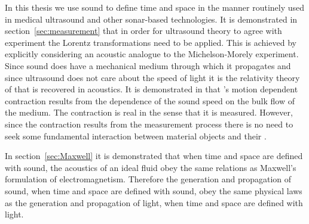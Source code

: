 





In this thesis we use sound to define time and space 
in the manner  routinely used in medical ultrasound and other sonar-based technologies.
It is demonstrated in section~\ref{sec:measurement} that in order for ultrasound theory 
to agree with experiment the Lorentz transformations need to be applied.
This is achieved by explicitly considering an acoustic analogue to the Michelson-Morely experiment.
Since sound  does have a mechanical medium through which it propagates and since ultrasound does not care about the speed of light
it is the relativity theory of \Poincare that is recovered in acoustics.
It is demonstrated in   that \Poincare's motion dependent contraction 
results from the dependence of the  sound speed on the bulk flow of the medium.
The contraction is real in the sense that it is measured.
However, since the contraction results from the measurement process there is 
no need to seek some fundamental interaction between material objects and their \aether.

In section~\ref{sec:Maxwell} it is demonstrated that  when time and space are defined with sound, 
the acoustics of an ideal fluid obey the same relations as Maxwell's formulation of electromagnetism.
Therefore the generation and propagation of sound,  when time and space are defined with  sound,
obey the same physical laws as the generation and propagation of light,  when time and space are defined with light.


